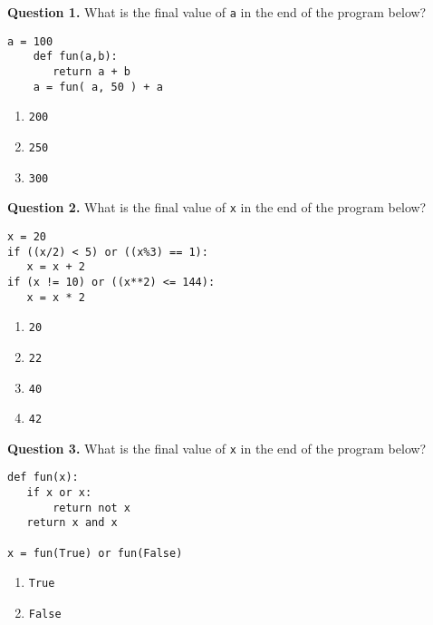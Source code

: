 \documentclass[12pt]{article}
\begin{document}


{\bf Question 1.}   What is the final value of \texttt{a} in the end of the program below?
\begin{lstlisting}[frame=single]
  	a = 100
  	def fun(a,b):
  	   return a + b
  	a = fun( a, 50 ) + a
\end{lstlisting}
\vspace{-0.5cm}
  \begin{enumerate}[label=\Alph*]
  	\item  \texttt{200}
  	\item  \texttt{250} %
  	\item  \texttt{300}
  \end{enumerate}

{\bf Question 2.}    What is the final value of \texttt{x} in the end of the program below?
\begin{lstlisting}[frame=single]
x = 20
if ((x/2) < 5) or ((x%3) == 1):
   x = x + 2
if (x != 10) or ((x**2) <= 144):
   x = x * 2
  \end{lstlisting}
  \vspace{-0.5cm}
  \begin{enumerate}[label=\Alph*]
  \item  \texttt{20}
  \item  \texttt{22}
  \item  \texttt{40}  %
  \item  \texttt{42} 
  \end{enumerate} 


{\bf Question 3.}  What is the final value of \texttt{x}  in the end of the program below?
\begin{lstlisting}[frame=single]
def fun(x):
   if x or x:
       return not x
   return x and x

x = fun(True) or fun(False)
\end{lstlisting}
\vspace{-0.5cm}
\begin{enumerate}[label=\Alph*]
 \item  \texttt{True}
 \item  \texttt{False}  %
\end{enumerate}
\end{document}
